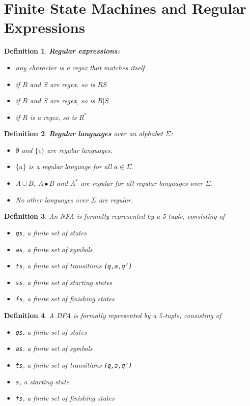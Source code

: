 \documentclass{article}
\theoremstyle{sltheorem}
\newtheorem{definition}{Definition}
\begin{document}
\section{Finite State Machines and Regular Expressions}
\begin{definition}
    \textbf{Regular expressions:}
    \begin{itemize}
        \item any character is a regex that matches itself
        \item if $R$ and $S$ are regex, so is $RS$
        \item if $R$ and $S$ are regex, so is $R|S$
        \item if $R$ is a regex, so is $R^*$
    \end{itemize}
\end{definition}
\begin{definition}
    \textbf{Regular languages} over an alphabet $\Sigma$:
    \begin{itemize}
        \item $\emptyset$ and $\{\epsilon\}$ are regular languages.
        \item $\{a\}$ is a regular language for all $a\in\Sigma$.
        \item $A\cup B$, $A\bullet B$ and $A^*$ are regular for all regular languages over $\Sigma$.
        \item No other languages over $\Sigma$ are regular.
    \end{itemize}
\end{definition}
\begin{definition}
    An NFA is formally represented by a 5-tuple, consisting of
    \begin{itemize}
        \item \texttt{qs}, a finite set of states
        \item \texttt{as}, a finite set of symbols
        \item \texttt{ts}, a finite set of transitions \texttt{(q,a,q')}
        \item \texttt{ss}, a finite set of starting states
        \item \texttt{fs}, a finite set of finishing states
    \end{itemize}
\end{definition}
\begin{definition}
    A DFA is formally represented by a 5-tuple, consisting of
    \begin{itemize}
        \item \texttt{qs}, a finite set of states
        \item \texttt{as}, a finite set of symbols
        \item \texttt{ts}, a finite set of transitions \texttt{(q,a,q')}
        \item \texttt{s}, a starting state
        \item \texttt{fs}, a finite set of finishing states
    \end{itemize}
\end{definition}
\end{document}
